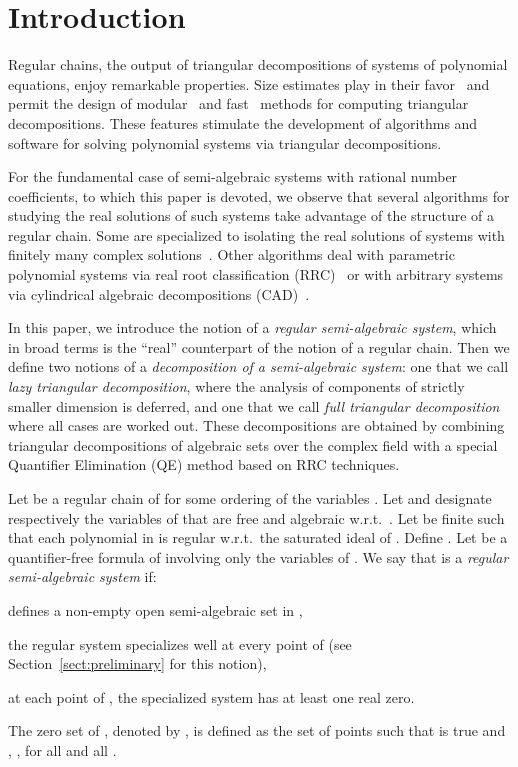 \documentclass{sig-alternate}
\begin{document}
\section{Introduction}
Regular chains, the output of triangular decompositions of systems 
of polynomial equations, enjoy remarkable properties.
Size estimates play in their favor~\cite{DaSKac09}
and permit the design of modular~\cite{DMSWX05a} and
fast~\cite{LiMorenoPan09} methods for computing
triangular decompositions.
These features stimulate the development of algorithms
and software for solving polynomial systems
via triangular decompositions.

For the fundamental case of 
semi-algebraic systems
with rational number coefficients, to which this paper is devoted,
we observe that several algorithms for studying the real solutions
of such systems take advantage of the structure of a regular chain.
Some are specialized to isolating the real solutions of
systems with finitely many complex 
solutions~\cite{xz06,CGY07,BoulierChenLemaireMorenoMaza09}.
Other algorithms deal with parametric
polynomial systems via real root classification ({\small RRC})~\cite{yhx01}
or with arbitrary systems via cylindrical
algebraic decompositions ({\small CAD})~\cite{CMXY09}.

In this paper,
we introduce the notion of a {\em regular semi-algebraic system}, 
which in broad terms  is the ``real''
counterpart of the notion of a regular chain.
Then we define two notions of a 
{\em decomposition of a semi-algebraic system}:
one that we call {\em lazy triangular decomposition}, 
where the ana\-lysis of components of strictly smaller dimension 
is deferred, and one that we call 
 {\em full triangular decomposition} 
where all cases are worked out.
These decompositions are 
obtained by combining triangular decompositions
of algebraic sets over the complex field with a special 
Quantifier Elimination ({\small QE}) method
based on {\small RRC} techniques.

\smallskip{}
Let  be a regular chain of  for some
ordering of the variables .
Let  and  
designate respectively the
variables of  that are free and algebraic w.r.t.\ .
Let  be finite such that
each polynomial in  is regular w.r.t.\ the saturated ideal of .
Define .
Let  be a quantifier-free formula of 
involving only the variables of .
We say that  is a {\em regular semi-algebraic system} if:
\begin{itemizeshort}
\item[]  defines a non-empty open 
             semi-algebraic set  in ,
\item[] the regular system  specializes well at every point  of 
    (see Section~\ref{sect:preliminary} for this notion),
\item[] at each point  of , 
the specialized system  
has at least one real zero.
\end{itemizeshort}
The zero set of , denoted by ,
is defined as
the set of points  such that 
 is true and , , for all 
and all .
\end{document}
